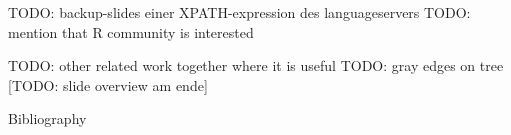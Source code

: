 


\setcounter{btdm@sectioncount}{5}%
\titleframe











\begin{frame}
   TODO: backup-slides einer XPATH-expression des languageservers
   TODO: mention that R community is interested
\end{frame}
\begin{frame}
TODO: other related work together where it is useful
TODO: gray edges on tree
[TODO: slide overview am ende]
\end{frame}

\begin{frame}{Bibliography}
   \printBibCommand
\end{frame}



